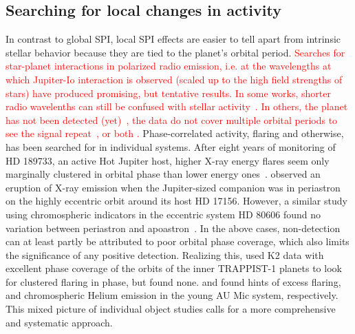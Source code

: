 \documentclass[twocolumn]{aastex631}
\begin{document}
\subsection{Searching for local changes in activity}
\label{sec:intro:local}
In contrast to global SPI, local SPI effects are easier to tell apart from intrinsic stellar behavior because they are tied to the planet's orbital period. \textcolor{red}{Searches for star-planet interactions in polarized radio emission, i.e. at the wavelengths at which Jupiter-Io interaction is observed (scaled up to the high field strengths of stars) have produced promising, but tentative results. In some works, shorter radio wavelenths can still be confused with stellar activity~\citep{pineda2023coherent}. In others, the planet has not been detected (yet)~\citep{vedantham2020coherent}, the data do not cover multiple orbital periods to see the signal repeat~\citep{perez-torres2021monitoring}, or both \citep{callingham2021population}.} Phase-correlated activity, flaring and otherwise, has been searched for in individual systems. After eight years of monitoring of HD 189733, an active Hot Jupiter host, higher X-ray energy flares seem only marginally clustered in orbital phase than lower energy ones~\citep{pillitteri2022xray}. \citet{maggio2015coordinated} observed an eruption of X-ray emission when the Jupiter-sized companion was in periastron on the highly eccentric orbit around its host HD 17156. However, a similar study using chromospheric indicators in the eccentric system HD 80606 found no variation between periastron and apoastron~\citep{figueira2016activity}. In the above cases, non-detection can at least partly be attributed to poor orbital phase coverage, which also limits the significance of any positive detection. Realizing this, \citet{fischer2019timevariable} used K2 data with excellent phase coverage of the orbits of the inner \mbox{TRAPPIST-1} planets to look for clustered flaring in phase, but found none. \citet{ilin2022searching} and \citet{klein2022one} found hints of excess flaring, and chromospheric Helium emission in the young AU Mic system, respectively. This mixed picture of individual object studies calls for a more comprehensive and systematic approach.
\end{document}
